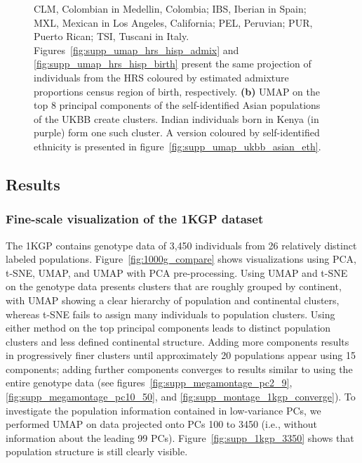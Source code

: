 \documentclass[12pt]{pnas-new}
\begin{document}
\begin{figure}
{    CLM, Colombian in Medellin, Colombia;
    IBS, Iberian in Spain;
    MXL, Mexican in Los Angeles, California;
    PEL, Peruvian;
    PUR, Puerto Rican;
    TSI, Tuscani in Italy. Figures~\ref{fig:supp_umap_hrs_hisp_admix} and \ref{fig:supp_umap_hrs_hisp_birth} present the same projection of individuals from the HRS coloured by estimated admixture proportions census region of birth, respectively. \textbf{(b)} UMAP on the top $8$ principal components of the self-identified Asian populations of the UKBB create clusters. Indian individuals born in Kenya (in purple) form one such cluster. A version coloured by self-identified ethnicity is presented in figure~\ref{fig:supp_umap_ukbb_asian_eth}. }
    \label{fig:subpops}
\end{figure}

\subsection*{Results}
\subsubsection*{Fine-scale visualization of the 1KGP dataset} The 1KGP contains genotype data of 3,450 individuals from 26 relatively distinct labeled populations\cite{10002015global}. Figure~\ref{fig:1000g_compare} shows visualizations using PCA, t-SNE, UMAP, and UMAP with PCA pre-processing. Using UMAP and t-SNE on the genotype data presents clusters that are roughly grouped by continent, with UMAP showing a clear hierarchy of population and continental clusters, whereas t-SNE fails to assign many individuals to population clusters. Using either method on the top principal components leads to distinct population clusters and less defined continental structure. Adding more components results in progressively finer clusters until approximately 20 populations appear using 15 components; adding further components converges to results similar to using the entire genotype data (see figures~\ref{fig:supp_megamontage_pc2_9}, \ref{fig:supp_megamontage_pc10_50}, and \ref{fig:supp_montage_1kgp_converge}). To investigate the population information contained in low-variance PCs, we performed UMAP on data projected onto PCs 100 to 3450 (i.e., without information about the leading 99 PCs). Figure~\ref{fig:supp_1kgp_3350} shows that population structure is still clearly visible.
\end{document}
